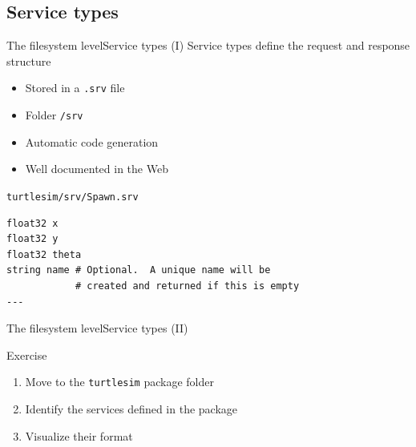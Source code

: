 \documentclass[10pt,compress]{beamer} %
\begin{document}
\subsection{Service types}
\begin{frame}[fragile]{The filesystem level}{Service types (I)}
	Service types define the request and response structure
  	\begin{itemize}
		\item Stored in a \texttt{.srv} file
		\item Folder \texttt{/srv}
		\item Automatic code generation
		\item Well documented in the Web
	\end{itemize}

	\begin{exampleblock}{\texttt{turtlesim/srv/Spawn.srv}}
	\begin{verbatim}
float32 x
float32 y
float32 theta
string name # Optional.  A unique name will be
            # created and returned if this is empty
---
\end{verbatim}
	\end{exampleblock}
\end{frame}

\begin{frame}[fragile]{The filesystem level}{Service types (II)}
	\begin{block}{Exercise}
	\begin{enumerate}
		\item Move to the \texttt{turtlesim} package folder
		\item Identify the services defined in the package
		\item Visualize their format
	\end{enumerate}
	\end{block}
\end{frame}
\end{document}
